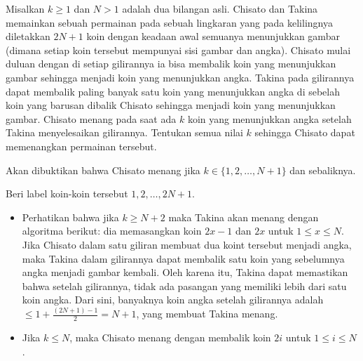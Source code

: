 \documentclass[12pt]{scrartcl}
\begin{document}
\begin{soaljawab}
    Misalkan $k \ge 1$ dan $N > 1$ adalah dua bilangan asli. Chisato dan Takina memainkan sebuah permainan pada sebuah lingkaran yang pada kelilingnya diletakkan $2N+1$ koin dengan keadaan awal semuanya menunjukkan gambar (dimana setiap koin tersebut mempunyai sisi gambar dan angka). Chisato mulai duluan dengan di setiap gilirannya ia bisa membalik koin yang menunjukkan gambar sehingga menjadi koin yang menunjukkan angka. Takina pada gilirannya dapat membalik paling banyak satu koin yang menunjukkan angka di sebelah koin yang barusan dibalik Chisato sehingga menjadi koin yang menunjukkan gambar. Chisato menang pada saat ada $k$ koin yang menunjukkan angka setelah Takina menyelesaikan gilirannya. Tentukan semua nilai $k$ sehingga Chisato dapat memenangkan permainan tersebut.
    \begin{solusi}
        Akan dibuktikan bahwa Chisato menang jika $k \in \{1,2,\dots,N+1\}$ dan sebaliknya.

        Beri label koin-koin tersebut $1,2,\dots,2N+1$. 
        
        \begin{itemize}
            \item         Perhatikan bahwa jika $k \ge N+2$ maka Takina akan menang dengan algoritma berikut: dia memasangkan koin $2x-1$ dan $2x$ untuk $1 \le x \le N$. Jika Chisato dalam satu giliran membuat dua koint tersebut menjadi angka, maka Takina dalam gilirannya dapat membalik satu koin yang sebelumnya angka menjadi gambar kembali. Oleh karena itu, Takina dapat memastikan bahwa setelah gilirannya, tidak ada pasangan yang memiliki lebih dari satu koin angka. Dari sini, banyaknya koin angka setelah gilirannya adalah $\le 1 + \frac{(2N+1)-1}{2}=N+1$, yang membuat Takina menang.

        \item Jika $k \le N$, maka Chisato menang dengan membalik koin $2i$ untuk $1 \le i \le N$.


\end{itemize}
\end{solusi}
\end{soaljawab}
\end{document}
